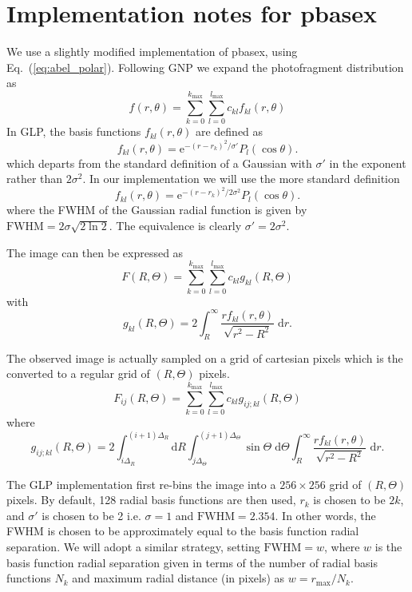 \documentclass{article}
\renewcommand{\eqref}[1]{Eq.~(\ref{#1})}
\renewcommand{\exp}[1]{\ensuremath{\mathrm{e}^{#1}}}
\newcommand{\dee}{\ensuremath{\mathrm{d}}}
\begin{document}
\section{Implementation notes for pbasex}
We use a slightly modified implementation of pbasex, using
\eqref{eq:abel_polar}. Following GNP we expand the photofragment distribution
as
\begin{equation}
  f(r,\theta)=
  \sum_{k=0}^{k_\mathrm{max}}
  \sum_{l=0}^{l_\mathrm{max}}
  c_{kl}f_{kl}(r,\theta)
\end{equation}
In GLP, the basis functions $f_{kl}(r,\theta)$ are defined as
\begin{equation}
  f_{kl}(r,\theta)=
  \exp{-(r-r_k)^2/\sigma'}P_l(\cos\theta).
\end{equation}
which departs from the standard definition of a Gaussian with $\sigma'$ in the
exponent rather than $2\sigma^2$. In our implementation we will use the more
standard definition
\begin{equation}
  f_{kl}(r,\theta)=
  \exp{-(r-r_k)^2/2\sigma^2}P_l(\cos\theta).
\end{equation}
where the FWHM of the Gaussian radial function is given by
$\mathrm{FWHM}=2\sigma\sqrt{2\ln2}$. The equivalence is clearly
$\sigma'=2\sigma^2$.

The image can then be expressed as
\begin{equation}
  F(R, \Theta)=
  \sum_{k=0}^{k_\mathrm{max}}
  \sum_{l=0}^{l_\mathrm{max}}
  c_{kl}g_{kl}(R,\Theta)
\end{equation}
with
\begin{equation}
  g_{kl}(R,\Theta)=
  2\int_{R}^\infty
  \frac{rf_{kl}(r, \theta)}{\sqrt{r^2-R^2}}\;\dee r.
\end{equation}

The observed image is actually sampled on a grid of cartesian pixels which is
the converted to a regular grid of $(R, \Theta)$ pixels.
\begin{equation}
  F_{ij}(R, \Theta)=
  \sum_{k=0}^{k_\mathrm{max}}
  \sum_{l=0}^{l_\mathrm{max}}
  c_{kl}g_{ij;kl}(R,\Theta)
\end{equation}
where
\begin{equation}
  g_{ij;kl}(R,\Theta)=
  2
  \int_{i\Delta_R}^{(i+1)\Delta_R}\dee R
  \int_{j\Delta_\Theta}^{(j+1)\Delta_\Theta}\sin\Theta\;\dee \Theta
  \int_{R}^\infty
  \frac{rf_{kl}(r, \theta)}{\sqrt{r^2-R^2}}\;\dee r.
\end{equation}

The GLP implementation first re-bins the image into a $256\times256$ grid of
$(R, \Theta)$ pixels. By default, 128 radial basis functions are then used,
$r_k$ is chosen to be $2k$, and $\sigma'$ is chosen to be 2 i.e. $\sigma=1$
and $\mathrm{FWHM}=2.354$. In other words, the FWHM is chosen to be
approximately equal to the basis function radial separation. We will adopt a
similar strategy, setting $\mathrm{FWHM}=w$, where $w$ is the basis function
radial separation given in terms of the number of radial basis functions $N_k$
and maximum radial distance (in pixels) as $w=r_\mathrm{max}/N_k$.
\end{document}
